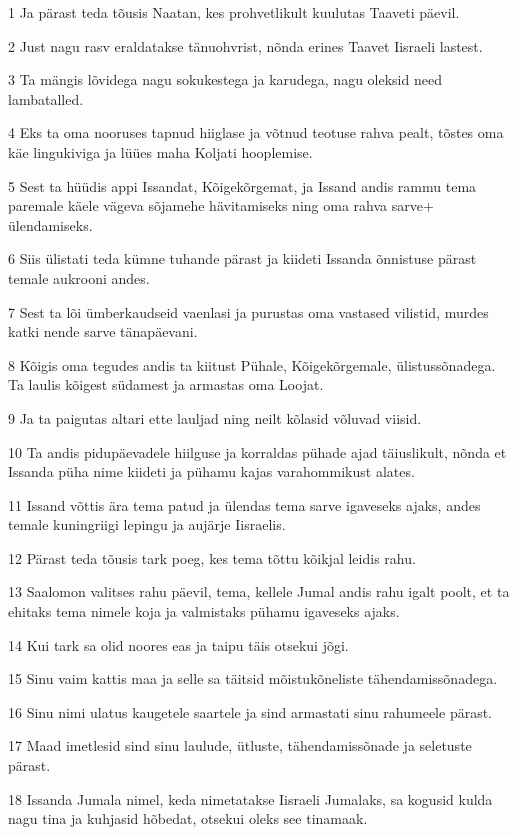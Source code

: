 \par 1 Ja pärast teda tõusis Naatan, kes prohvetlikult kuulutas Taaveti päevil.
\par 2 Just nagu rasv eraldatakse tänuohvrist, nõnda erines Taavet Iisraeli lastest.
\par 3 Ta mängis lõvidega nagu sokukestega ja karudega, nagu oleksid need lambatalled.
\par 4 Eks ta oma nooruses tapnud hiiglase ja võtnud teotuse rahva pealt, tõstes oma käe lingukiviga ja lüües maha Koljati hooplemise.
\par 5 Sest ta hüüdis appi Issandat, Kõigekõrgemat, ja Issand andis rammu tema paremale käele vägeva sõjamehe hävitamiseks ning oma rahva sarve+ ülendamiseks.
\par 6 Siis ülistati teda kümne tuhande pärast ja kiideti Issanda õnnistuse pärast temale aukrooni andes.
\par 7 Sest ta lõi ümberkaudseid vaenlasi ja purustas oma vastased vilistid, murdes katki nende sarve tänapäevani.
\par 8 Kõigis oma tegudes andis ta kiitust Pühale, Kõigekõrgemale, ülistussõnadega. Ta laulis kõigest südamest ja armastas oma Loojat.
\par 9 Ja ta paigutas altari ette lauljad ning neilt kõlasid võluvad viisid.
\par 10 Ta andis pidupäevadele hiilguse ja korraldas pühade ajad täiuslikult, nõnda et Issanda püha nime kiideti ja pühamu kajas varahommikust alates.
\par 11 Issand võttis ära tema patud ja ülendas tema sarve igaveseks ajaks, andes temale kuningriigi lepingu ja aujärje Iisraelis.
\par 12 Pärast teda tõusis tark poeg, kes tema tõttu kõikjal leidis rahu.
\par 13 Saalomon valitses rahu päevil, tema, kellele Jumal andis rahu igalt poolt, et ta ehitaks tema nimele koja ja valmistaks pühamu igaveseks ajaks.
\par 14 Kui tark sa olid noores eas ja taipu täis otsekui jõgi.
\par 15 Sinu vaim kattis maa ja selle sa täitsid mõistukõneliste tähendamissõnadega.
\par 16 Sinu nimi ulatus kaugetele saartele ja sind armastati sinu rahumeele pärast.
\par 17 Maad imetlesid sind sinu laulude, ütluste, tähendamissõnade ja seletuste pärast.
\par 18 Issanda Jumala nimel, keda nimetatakse Iisraeli Jumalaks, sa kogusid kulda nagu tina ja kuhjasid hõbedat, otsekui oleks see tinamaak.
